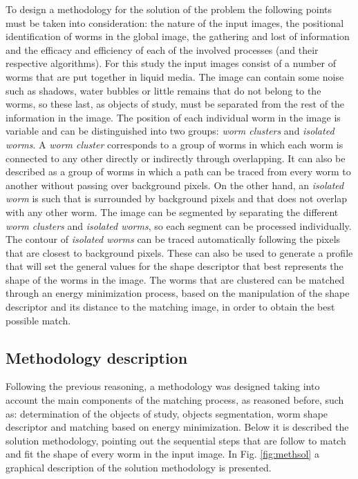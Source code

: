 To design a methodology for the solution of the problem the following
points must be taken into consideration: the nature of the input
images, the positional identification of worms in the global image,
the gathering and lost of information and the efficacy and efficiency
of each of the involved processes (and their respective algorithms).
For this study the input images consist of a number of worms that
are put together in liquid media. The image can contain some noise such as
shadows, water bubbles or little remains that do not belong to the worms, so
these last, as objects of study, must be separated from the rest of 
the information in the image. The position of each individual
worm in the image is variable and can be distinguished into two 
groups: \emph{worm clusters} and \emph{isolated worms}. A 
\emph{worm cluster} corresponds to a group of worms in which 
each worm is connected to any other directly or indirectly
through overlapping. It can also be described as a group of worms in which a 
path can be traced from every worm to another without passing over 
background pixels. On the other hand, an \emph{isolated worm} is such
that is surrounded by background pixels and that does not overlap
with any other worm. The image can be segmented by separating the different 
\emph{worm clusters} and \emph{isolated worms}, so each segment
can be processed individually. The contour of \emph{isolated worms} can be
traced automatically following the pixels that are closest to background pixels.
These can also be used to generate a profile that will set the general values
for the shape descriptor that best represents the shape of the worms in the image.
The worms that are clustered can be matched through an energy minimization
process, based on the manipulation of the shape descriptor and its distance
to the matching image, in order to obtain the best possible match.

\subsection{Methodology description}
\label{met:description}

Following the previous reasoning, a methodology was designed taking into account
the main components of the matching process, as reasoned before, such as: 
determination of the objects 
of study, objects segmentation, worm shape descriptor and matching based on 
energy minimization.
Below it is described the solution methodology, pointing out the sequential steps
that are follow to match and fit the shape of every worm in the input image.
In Fig. \ref{fig:methsol} a graphical description of the solution methodology is
presented.\\

